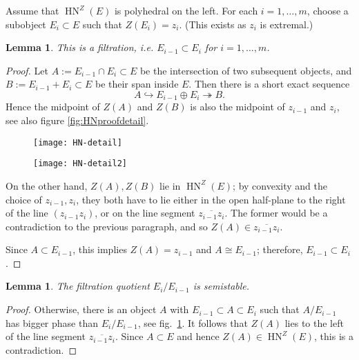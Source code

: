 \documentclass[leqno,11pt,twoside]{amsart}
\newtheorem{Lem}[Thm]{Lemma}
\theoremstyle{definition}
\begin{document}
Assume that ${\mathop{\mathrm{HN}}\nolimits}^Z(E)$ is polyhedral on the left. For each $i = 1, \dots, m$, choose a subobject $E_i \subset E$ such that $Z(E_i) = z_i$. (This exists as $z_i$ is extremal.)
\begin{Lem}  \label{lem:filtration}
This is a filtration, i.e. $E_{i-1} \subset E_{i}$ for $i = 1, \dots, m$. 
\end{Lem}
\begin{proof}
Let $A := E_{i-1} \cap E_i \subset E$ be the intersection of two subsequent objects, and
$B := E_{i-1} + E_i \subset E$ be their span inside $E$. Then there is a short exact sequence
\[ A {\ensuremath{\hookrightarrow}} E_{i-1} \oplus E_i {\ensuremath{\twoheadrightarrow}} B. \]
Hence the midpoint of $Z(A)$ and $Z(B)$ is also the midpoint of $z_{i-1}$ and $z_i$,
see also figure \ref{fig:HNproofdetail}.

\begin{figure}[!htb]
\centering
\begin{minipage}{0.45\textwidth}
	\centering
        \texttt{[image: HN-detail]}
    \label{fig:HNproofdetail}
\end{minipage}
\begin{minipage}{0.45\textwidth}
	\centering
        \texttt{[image: HN-detail2]}
    \label{fig:HNproofdetail2}
\end{minipage}
\end{figure}

On the other hand, $Z(A), Z(B)$ lie in ${\mathop{\mathrm{HN}}\nolimits}^Z(E)$; by convexity and the choice of $z_{i-1}, z_i$,
they both have to lie either in the open half-plane to the right of the line
$\left(z_{i-1}z_i\right)$, or on the line segment $\overline{z_{i-1}z_i}$. The former would be a
contradiction to the previous paragraph, and so $Z(A) \in \overline{z_{i-1}z_i}$. 

Since $A \subset E_{i-1}$, this implies $Z(A) = z_{i-1}$ and $A \cong E_{i-1}$; therefore, 
$E_{i-1} \subset E_i$.
\end{proof}

\begin{Lem} \label{lem:quotsemistable}
The filtration quotient $E_i/E_{i-1}$ is semistable. 
\end{Lem}
\begin{proof}
Otherwise, there is an object $A$ with $E_{i-1} \subset A \subset E_i$ such that
$A/E_{i-1}$ has bigger phase than $E_i/E_{i-1}$, see fig.~\ref{fig:HNproofdetail2}. It follows that $Z(A)$ lies to the left of the line
segment $\overline{z_{i-1}z_i}$. Since $A \subset E$ and hence $Z(A) \in {\mathop{\mathrm{HN}}\nolimits}^Z(E)$, this is a
contradiction.
\end{proof}
\end{document}
